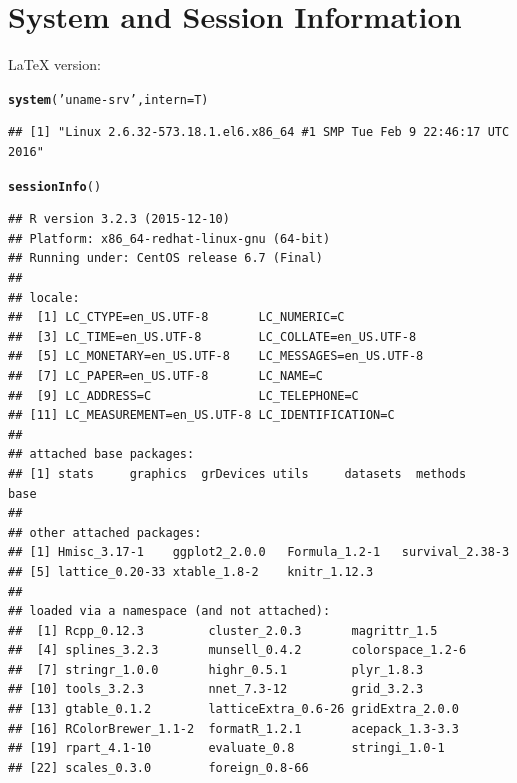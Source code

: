 \documentclass[12pt,a4paper]{article}\usepackage[]{graphicx}\usepackage[]{color}
\makeatletter
\newcommand{\hlstr}[1]{\textcolor[rgb]{0.192,0.494,0.8}{#1}}%
\newcommand{\hlstd}[1]{\textcolor[rgb]{0.345,0.345,0.345}{#1}}%
\newcommand{\hlkwc}[1]{\textcolor[rgb]{0.333,0.667,0.333}{#1}}%
\newcommand{\hlkwd}[1]{\textcolor[rgb]{0.737,0.353,0.396}{\textbf{#1}}}%
\newenvironment{kframe}{%
 \def\at@end@of@kframe{}%
 \ifinner\ifhmode%
  \def\at@end@of@kframe{\end{minipage}}%
  \begin{minipage}{\columnwidth}%
 \fi\fi%
 \def\FrameCommand##1{\hskip\@totalleftmargin \hskip-\fboxsep
 \colorbox{shadecolor}{##1}\hskip-\fboxsep
     \hskip-\linewidth \hskip-\@totalleftmargin \hskip\columnwidth}%
 \MakeFramed {\advance\hsize-\width
   \@totalleftmargin\z@ \linewidth\hsize
   \@setminipage}}%
 {\par\unskip\endMakeFramed%
 \at@end@of@kframe}
\newenvironment{knitrout}{}{} %
\makeatother
\begin{document}
\section{System and Session Information}\label{session}
\LaTeX{} version: \LaTeXe~ \fmtversion
\begin{knitrout}\footnotesize
{}\color{fgcolor}\begin{kframe}
\begin{alltt}
\hlkwd{system}\hlstd{(}\hlstr{'uname -srv'}\hlstd{,}\hlkwc{intern}\hlstd{=T)}
\end{alltt}
\begin{verbatim}
## [1] "Linux 2.6.32-573.18.1.el6.x86_64 #1 SMP Tue Feb 9 22:46:17 UTC 2016"
\end{verbatim}
\begin{alltt}
\hlkwd{sessionInfo}\hlstd{()}
\end{alltt}
\begin{verbatim}
## R version 3.2.3 (2015-12-10)
## Platform: x86_64-redhat-linux-gnu (64-bit)
## Running under: CentOS release 6.7 (Final)
## 
## locale:
##  [1] LC_CTYPE=en_US.UTF-8       LC_NUMERIC=C              
##  [3] LC_TIME=en_US.UTF-8        LC_COLLATE=en_US.UTF-8    
##  [5] LC_MONETARY=en_US.UTF-8    LC_MESSAGES=en_US.UTF-8   
##  [7] LC_PAPER=en_US.UTF-8       LC_NAME=C                 
##  [9] LC_ADDRESS=C               LC_TELEPHONE=C            
## [11] LC_MEASUREMENT=en_US.UTF-8 LC_IDENTIFICATION=C       
## 
## attached base packages:
## [1] stats     graphics  grDevices utils     datasets  methods   base     
## 
## other attached packages:
## [1] Hmisc_3.17-1    ggplot2_2.0.0   Formula_1.2-1   survival_2.38-3
## [5] lattice_0.20-33 xtable_1.8-2    knitr_1.12.3   
## 
## loaded via a namespace (and not attached):
##  [1] Rcpp_0.12.3         cluster_2.0.3       magrittr_1.5       
##  [4] splines_3.2.3       munsell_0.4.2       colorspace_1.2-6   
##  [7] stringr_1.0.0       highr_0.5.1         plyr_1.8.3         
## [10] tools_3.2.3         nnet_7.3-12         grid_3.2.3         
## [13] gtable_0.1.2        latticeExtra_0.6-26 gridExtra_2.0.0    
## [16] RColorBrewer_1.1-2  formatR_1.2.1       acepack_1.3-3.3    
## [19] rpart_4.1-10        evaluate_0.8        stringi_1.0-1      
## [22] scales_0.3.0        foreign_0.8-66
\end{verbatim}
\end{kframe}
\end{knitrout}
\end{document}
